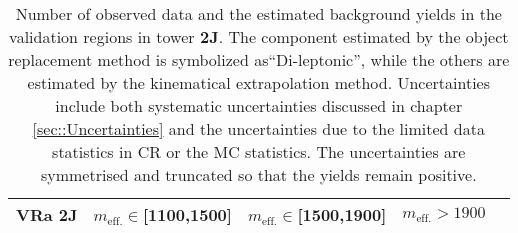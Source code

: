 
\newcommand{\vrtablecaption}[1]{%
      Number of observed data and the estimated background yields in the validation regions in tower \textbf{#1}. 
      The component estimated by the object replacement method is symbolized as``Di-leptonic'',
      while the others are estimated by the kinematical extrapolation method.
      Uncertainties include both systematic uncertainties discussed in chapter \ref{sec::Uncertainties} and the uncertainties due to the limited data statistics in CR or the MC statistics. 
      The uncertainties are symmetrised and truncated so that the yields remain positive.
}

\begin{table}
  \begin{center}
    \caption{ \label{tab::BGestimation::VRyields_2J} \vrtablecaption{2J}  }
    
    \begin{tabular*}{\textwidth}{@{\extracolsep{\fill}}lrrrr}
      \toprule
      \textbf{VRa 2J} & $m_{\mathrm{eff.}}\in$[1100,1500] & $m_{\mathrm{eff.}}\in$[1500,1900] & $m_{\mathrm{eff.}}>1900$ \\
      \midrule
      

\end{tabular*}
\end{center}
\end{table}
